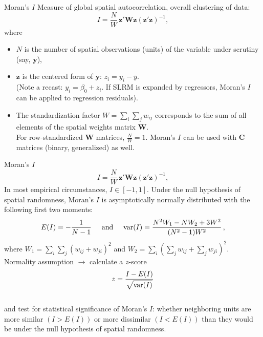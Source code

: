 \documentclass{beamer}
\begin{document}
\begin{frame}{Moran's $I$}
Measure of global spatial autocorrelation, overall clustering of data:
\begin{equation*}
I = \frac{N}{W}\,\bm{z}'\bm{Wz}(\bm{z}'\bm{z})^{-1},
\end{equation*}     
where 
\begin{itemize}
    \item[] $N$ is the number of spatial observations (units) of the variable under scrutiny (say, $\bm{y}$),
    \smallskip
    \item[] $\bm{z}$ is the centered form of $\bm{y}$: $z_i = y_i - \bar{y}$.\\
    (Note a recast: $y_i = \beta_0 + z_i$. If SLRM is expanded by regressors, Moran's $I$ can be applied to regression residuals).
    \smallskip
    \item[] The standardization factor $W = \sum_{i}\sum_{j}w_{ij}$ corresponds to the sum of all elements of the spatial weights matrix $\bm{W}$. \\For row-standardized $\bm{W}$ matrices, $\tfrac{N}{W}=1$. Moran's $I$ can be used with $\bm{C}$ matrices (binary, generalized) as well.
\end{itemize}
\end{frame}
\begin{frame}{Moran's $I$}
\vspace{-0.2cm}
\begin{equation*}
I = \frac{N}{W}\,\bm{z}'\bm{Wz}(\bm{z}'\bm{z})^{-1},
\end{equation*}     
In most empirical circumstances, $I \in [ -1,1 ]$. Under the null hypothesis of spatial randomness, Moran’s $I$ is asymptotically normally distributed with the following first two moments:
\begin{equation*}
E(I) = -\frac{1}{N-1} \hspace{0.5cm} 
\textnormal{and} \hspace{0.5cm} 
\textnormal{var}(I) = \frac{N^2W_1 - NW_2 +3W^2}{(N^2-1)W^2} \,,
\end{equation*}  
where $W_1 = \sum_i \sum_j (w_{ij}+w_{ji})^2$ and $W_2 = \sum_i (\sum_j w_{ij} + \sum_j w_{ji})^2$.\\
\medskip
Normality assumption $\rightarrow$ calculate a $z$-score 
$$z=\frac{I-E(I)}{\sqrt{\textnormal{var}(I)}} $$\\
and test for statistical significance of Moran's $I$: whether neighboring units are more similar $(I > E(I))$ or more dissimilar $(I < E(I))$ than they would be under the null hypothesis of spatial randomness.
\end{frame}
\end{document}
